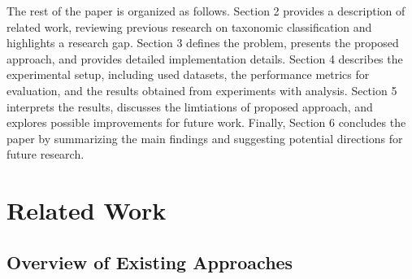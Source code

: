 \documentclass{article}
\begin{document}
            The rest of the paper is organized as follows. Section 2 provides a description of related work, reviewing previous research on taxonomic classification and highlights a research gap. Section 3 defines the problem, presents the proposed approach, and provides detailed implementation details. Section 4 describes the experimental setup, including used datasets, the performance metrics for evaluation, and the results obtained from experiments with analysis. Section 5 interprets the results, discusses the limtiations of proposed approach, and explores possible improvements for future work. Finally, Section 6 concludes the paper by summarizing the main findings and suggesting potential directions for future research.

    \clearpage
    \section{Related Work}

        \subsection{Overview of Existing Approaches}
\end{document}
